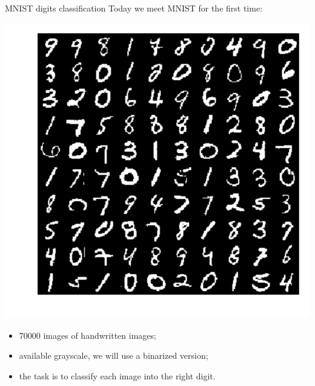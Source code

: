 \bgroup
\begin{frame}{MNIST digits classification}
Today we meet MNIST for the first time:

\begin{minipage}{0.45\textwidth}
\centering
\includegraphics[width=\textwidth]{img/mnist.pdf}
\end{minipage}
\begin{minipage}{0.45\textwidth}
\begin{itemize}
\item 70000 images of handwritten images;
\item available grayscale, we will use a binarized version;
\item the task is to classify each image into the right digit.
\end{itemize}
\end{minipage}

\end{frame}
\egroup